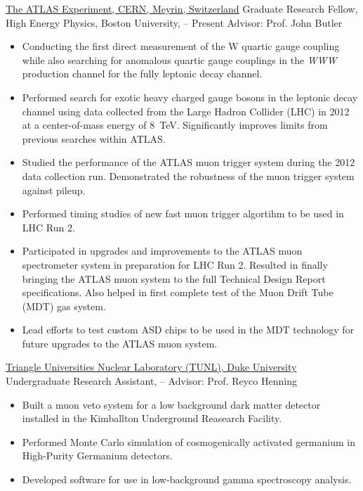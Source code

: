 \href{http://www.atlas.ch}{{The ATLAS Experiment}, CERN, Meyrin, Switzerland} \newline
Graduate Research Fellow, High Energy Physics, Boston University,  -- Present \newline
Advisor: Prof. John Butler
{\begin{itemize}
\item Conducting the first direct measurement of the W quartic gauge coupling while also searching for anomalous quartic gauge couplings in the \textit{WWW} production channel for the fully leptonic decay channel.
\item Performed search for exotic heavy charged gauge bosons in the leptonic decay channel using data collected from the Large Hadron Collider (LHC) in 2012 at a center-of-mass energy of 8~TeV. Significantly improves limits from previous searches within ATLAS.
\item Studied the performance of the ATLAS muon trigger system during 
the 2012 data collection run.  Demonstrated the robustness of the muon trigger system against pileup.
\item Performed timing studies of new fast muon trigger algortihm to 
be used in LHC Run 2.
\item Participated in upgrades and improvements to the ATLAS muon spectrometer system in preparation for LHC Run 2.  Resulted in finally 
bringing the ATLAS muon system to the full Technical Design Report specifications. Also helped in first complete test of the Muon Drift Tube (MDT) gas system.
\item Lead efforts to test custom ASD chips to be used in the MDT 
technology for future upgrades to the ATLAS muon system.
\end{itemize}
}

\href{http://www.tunl.duke.edu}{{Triangle Universities Nuclear Laboratory (TUNL)}, Duke University} \newline
Undergraduate Research Assistant,  --  \newline
Advisor: Prof. Reyco Henning 
{\begin{itemize}
\item Built a muon veto system for a low background dark matter detector installed in the Kimballton Underground Reasearch Facility.
\item Performed Monte Carlo simulation of cosmogenically activated germanium in High-Purity Germanium detectors.
\item Developed software for use in low-background gamma spectroscopy analysis.
\end{itemize}
}

